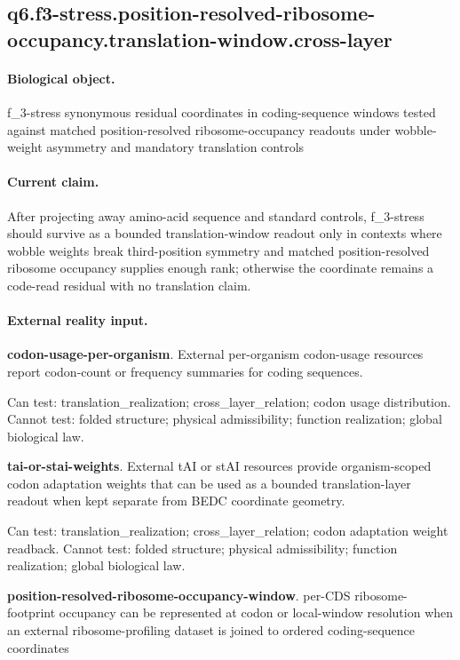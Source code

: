 \subsection{q6.f3-stress.position-resolved-ribosome-occupancy.translation-window.cross-layer}

\paragraph{Biological object.} f\_3-stress synonymous residual coordinates in coding-sequence windows tested against matched position-resolved ribosome-occupancy readouts under wobble-weight asymmetry and mandatory translation controls

\paragraph{Current claim.} After projecting away amino-acid sequence and standard controls, f\_3-stress should survive as a bounded translation-window readout only in contexts where wobble weights break third-position symmetry and matched position-resolved ribosome occupancy supplies enough rank; otherwise the coordinate remains a code-read residual with no translation claim.

\paragraph{External reality input.}
\textbf{codon-usage-per-organism}. External per-organism codon-usage resources report codon-count or frequency summaries for coding sequences.

Can test: translation\_realization; cross\_layer\_relation; codon usage distribution. Cannot test: folded structure; physical admissibility; function realization; global biological law.

\textbf{tai-or-stai-weights}. External tAI or stAI resources provide organism-scoped codon adaptation weights that can be used as a bounded translation-layer readout when kept separate from BEDC coordinate geometry.

Can test: translation\_realization; cross\_layer\_relation; codon adaptation weight readback. Cannot test: folded structure; physical admissibility; function realization; global biological law.

\textbf{position-resolved-ribosome-occupancy-window}. per-CDS ribosome-footprint occupancy can be represented at codon or local-window resolution when an external ribosome-profiling dataset is joined to ordered coding-sequence coordinates

